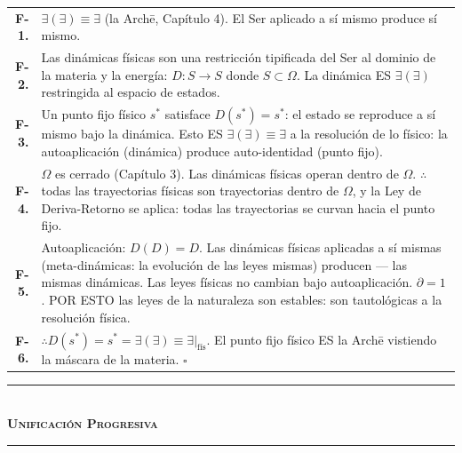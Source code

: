 \documentclass[10pt, openany, oneside]{book}
\renewcommand{\normalsize}{\fontsize{10}{13}\selectfont}
\renewcommand{\footnotesize}{\fontsize{8.5}{11}\selectfont}
\begin{document}
\vspace{0.5em}

{\footnotesize
\noindent\begin{tabular}{r p{}}
\textbf{F-1.} & $\exists(\exists) \equiv \exists$ (la Arch\={e}, Capítulo 4). El Ser aplicado a sí mismo produce sí mismo. \\[0.3em]
\textbf{F-2.} & Las dinámicas físicas son una restricción tipificada del Ser al dominio de la materia y la energía: $D: S \to S$ donde $S \subset \Omega$. La dinámica ES $\exists(\exists)$ restringida al espacio de estados. \\[0.3em]
\textbf{F-3.} & Un punto fijo físico $s^*$ satisface $D(s^*) = s^*$: el estado se reproduce a sí mismo bajo la dinámica. Esto ES $\exists(\exists) \equiv \exists$ a la resolución de lo físico: la autoaplicación (dinámica) produce auto-identidad (punto fijo). \\[0.3em]
\textbf{F-4.} & $\Omega$ es cerrado (Capítulo 3). Las dinámicas físicas operan dentro de $\Omega$. $\therefore$ todas las trayectorias físicas son trayectorias dentro de $\Omega$, y la Ley de Deriva-Retorno se aplica: todas las trayectorias se curvan hacia el punto fijo. \\[0.3em]
\textbf{F-5.} & Autoaplicación: $D(D) = D$. Las dinámicas físicas aplicadas a sí mismas (meta-dinámicas: la evolución de las leyes mismas) producen --- las mismas dinámicas. Las leyes físicas no cambian bajo autoaplicación. $\partial = 1$. POR ESTO las leyes de la naturaleza son estables: son tautológicas a la resolución física. \\[0.3em]
\textbf{F-6.} & $\therefore D(s^*) = s^* = \exists(\exists) \equiv \exists|_{\text{fís}}$. El punto fijo físico ES la Arch\={e} vistiendo la máscara de la materia. $\square$ \\[0.3em]
\end{tabular}
}

\vspace{1.5em}


\begin{center}
    \rule{0.3\textwidth}{0.4pt}\\[0.5em]
    {\normalsize\bfseries\scshape Unificación Progresiva}\\[0.3em]
    \rule{0.3\textwidth}{0.4pt}
\end{center}
\end{document}
